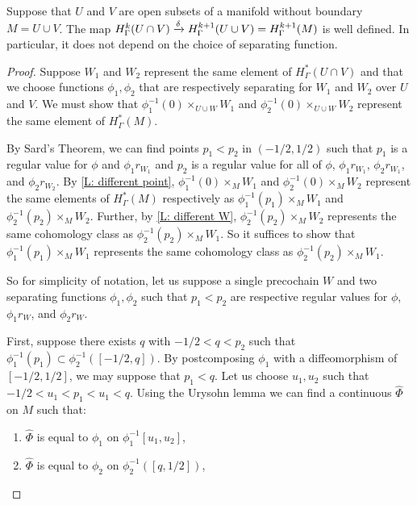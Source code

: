 \begin{proposition}\label{P: connecting}
	Suppose that $U$ and $V$ are open subsets of a manifold without boundary $M = U \cup V$.
	The map $H^k_\Gamma(U \cap V) \xrightarrow{\delta} H^{k+1}_\Gamma(U \cup V) = H^{k+1}_\Gamma(M)$ is well defined.
	In particular, it does not depend on the choice of separating function.
\end{proposition}

\begin{proof}
	Suppose $W_1$ and $W_2$ represent the same element of $H^*_\Gamma(U \cap V)$ and that we choose functions $\phi_1,\phi_2$ that are respectively separating for $W_1$ and $W_2$ over $U$ and $V$.
	We must show that $\phi_1^{-1}(0)\times_{U \cup W} W_1$ and $\phi_2^{-1}(0)\times_{U \cup W} W_2$ represent the same element of $H^*_\Gamma(M)$.

	By Sard's Theorem, we can find points $p_1<p_2$ in $(-1/2,1/2)$ such that $p_1$ is a regular value for $\phi$ and $\phi_1 r_{W_1}$ and $p_2$ is a regular value for all of $\phi$, $\phi_1 r_{W_1}$, $\phi_2 r_{W_1}$, and $\phi_2 r_{W_2}$.
	By \cref{L: different point}, $\phi_1^{-1}(0) \times_{M} W_1$ and $\phi_2^{-1}(0) \times_{M} W_2$ represent the same elements of $H^*_\Gamma(M)$ respectively as $\phi_1^{-1}(p_1) \times_{M} W_1$ and $\phi_2^{-1}(p_2) \times_{M} W_2$.
	Further, by \cref{L: different W}, $\phi_2^{-1}(p_2) \times_{M} W_2$ represents the same cohomology class as $\phi_2^{-1}(p_2) \times_{M} W_1$.
	So it suffices to show that $\phi_1^{-1}(p_1) \times_{M} W_1$ represents the same cohomology class as $\phi_2^{-1}(p_2) \times_{M} W_1$.

 	So for simplicity of notation, let us suppose a single precochain $W$ and two separating functions $\phi_1,\phi_2$ such that $p_1 < p_2$ are respective regular values for $\phi$, $\phi_1 r_W$, and $\phi_2 r_W$.

	First, suppose there exists $q$ with $-1/2<q<p_2$ such that $\phi_1^{-1}(p_1) \subset \phi_2^{-1}([-1/2,q])$.
	By postcomposing $\phi_1$ with a diffeomorphism of $[-1/2,1/2]$, we may suppose that $p_1<q$.
	Let us choose $u_1,u_2$ such that $-1/2<u_1<p_1<u_1<q$.
	Using the Urysohn lemma we can find a continuous $\hat \Phi$ on $M$ such that:

	\begin{enumerate}
		\item $\hat \Phi$ is equal to $\phi_1$ on $\phi_1^{-1}[u_1,u_2]$,
		\item $\hat\Phi$ is equal to $\phi_2$ on $\phi_2^{-1}([q,1/2])$,


\end{enumerate}
\end{proof}
